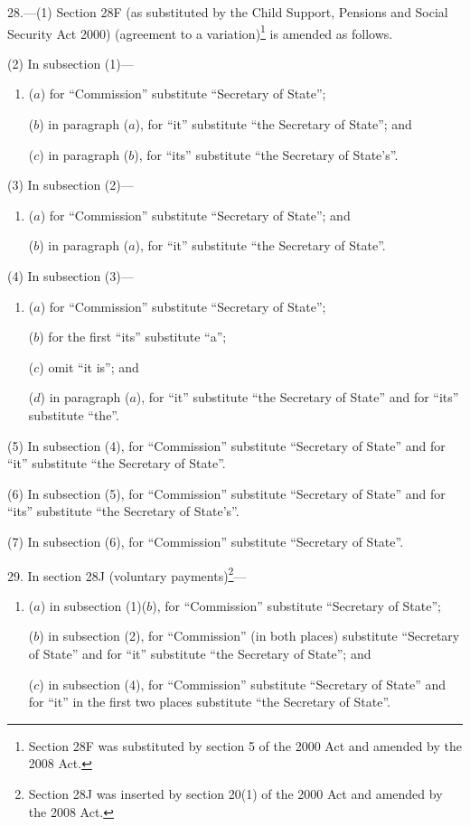 \documentclass[12pt,a4paper]{article}
\begin{document}
\medskip

28.---(1)  Section 28F (as substituted by the Child Support, Pensions and Social Security Act 2000) (agreement to a variation)\footnote{Section 28F was substituted by section 5 of the 2000 Act and amended by the 2008 Act.} is amended as follows.

(2) In subsection (1)—
\begin{enumerate}\item[]
($a$) for “Commission” substitute “Secretary of State”;

($b$) in paragraph ($a$), for “it” substitute “the Secretary of State”; and

($c$) in paragraph ($b$), for “its” substitute “the Secretary of State’s”.
\end{enumerate}

(3) In subsection (2)—
\begin{enumerate}\item[]
($a$) for “Commission” substitute “Secretary of State”; and

($b$) in paragraph ($a$), for “it” substitute “the Secretary of State”.
\end{enumerate}

(4) In subsection (3)—
\begin{enumerate}\item[]
($a$) for “Commission” substitute “Secretary of State”;

($b$) for the first “its” substitute “a”;

($c$) omit “it is”; and

($d$) in paragraph ($a$), for “it” substitute “the Secretary of State” and for “its” substitute “the”.
\end{enumerate}

(5) In subsection (4), for “Commission” substitute “Secretary of State” and for “it” substitute “the Secretary of State”.

(6) In subsection (5), for “Commission” substitute “Secretary of State” and for “its” substitute “the Secretary of State’s”.

(7) In subsection (6), for “Commission” substitute “Secretary of State”.

\medskip

29.  In section 28J (voluntary payments)\footnote{Section 28J was inserted by section 20(1) of the 2000 Act and amended by the 2008 Act.}—
\begin{enumerate}\item[]
($a$) in subsection (1)($b$), for “Commission” substitute “Secretary of State”;

($b$) in subsection (2), for “Commission” (in both places) substitute “Secretary of State” and for “it” substitute “the Secretary of State”; and

($c$) in subsection (4), for “Commission” substitute “Secretary of State” and for “it” in the first two places substitute “the Secretary of State”.
\end{enumerate}
\end{document}
